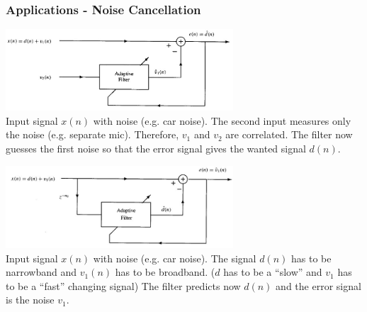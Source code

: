 \subsubsection{Applications - Noise Cancellation }
\begin{minipage}{9cm}
        \includegraphics[width=8.5cm]{../TSM_StatDig/bilder/adaptiveNoiseCancellation.jpg}\\
        Input signal $x(n)$ with noise (e.g. car noise).
        The second input measures only the noise (e.g. separate mic). Therefore, $v_1$ and $v_2$ are correlated.
        The filter now guesses the first noise so that the error signal gives the wanted signal $d(n)$.
\end{minipage}
\hspace{3mm}
\begin{minipage}{9cm}
        \includegraphics[width=8.5cm]{../TSM_StatDig/bilder/NoiseCancellationwithoutRef.jpg}\\
        Input signal $x(n)$ with noise (e.g. car noise). The signal $d(n)$ has to be narrowband and $v_1(n)$ has to be broadband. ($d$ has to be a ``slow''  and $v_1$ has to be a ``fast'' changing signal)
        The filter predicts now $d(n)$ and the error signal is the noise $v_1$.
\end{minipage}


